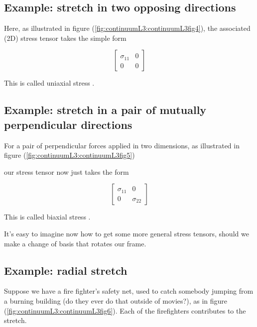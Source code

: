 \subsection{Example: stretch in two opposing directions}


Here, as illustrated in figure (\ref{fig:continuumL3:continuumL3fig4}), the associated (2D) stress tensor takes the simple form

\begin{equation}\label{eqn:continuumL3:370}
\begin{bmatrix}
\sigma_{11} & 0 \\
0 & 0
\end{bmatrix}
\end{equation}

This is called uniaxial stress .

\subsection{Example: stretch in a pair of mutually perpendicular directions}

For a pair of perpendicular forces applied in two dimensions, as illustrated in figure (\ref{fig:continuumL3:continuumL3fig5})

our stress tensor now just takes the form

\begin{equation}\label{eqn:continuumL3:390}
\begin{bmatrix}
\sigma_{11} & 0 \\
0 & \sigma_{22}
\end{bmatrix}
\end{equation}

This is called biaxial stress .

It's easy to imagine now how to get some more general stress tensors, should we make a change of basis that rotates our frame.

\subsection{Example: radial stretch}

Suppose we have a fire fighter's safety net, used to catch somebody jumping from a burning building (do they ever do that outside of movies?), as in figure (\ref{fig:continuumL3:continuumL3fig6}).  Each of the firefighters contributes to the stretch.  

